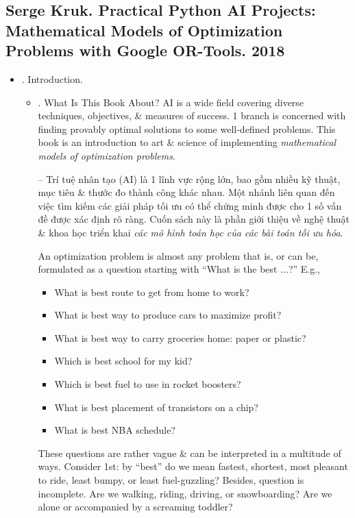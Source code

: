 \documentclass{article}
\begin{document}

\subsection{{\sc Serge Kruk}. Practical Python AI Projects: Mathematical Models of Optimization Problems with Google OR-Tools. 2018}

\begin{itemize}
    \item {. Introduction.}
    \begin{itemize}
        \item {. What Is This Book About?} AI is a wide field covering diverse techniques, objectives, \& measures of success. 1 branch is concerned with finding provably optimal solutions to some well-defined problems. This book is an introduction to art \& science of implementing {\it mathematical models of optimization problems}.

        -- Trí tuệ nhân tạo (AI) là 1 lĩnh vực rộng lớn, bao gồm nhiều kỹ thuật, mục tiêu \& thước đo thành công khác nhau. Một nhánh liên quan đến việc tìm kiếm các giải pháp tối ưu có thể chứng minh được cho 1 số vấn đề được xác định rõ ràng. Cuốn sách này là phần giới thiệu về nghệ thuật \& khoa học triển khai {\it các mô hình toán học của các bài toán tối ưu hóa}.

        An optimization problem is almost any problem that is, or can be, formulated as a question starting with ``What is the best $\ldots$?'' E.g.,
        \begin{itemize}
            \item What is best route to get from home to work?
            \item What is best way to produce cars to maximize profit?
            \item What is best way to carry groceries home: paper or plastic?
            \item Which is best school for my kid?
            \item Which is best fuel to use in rocket boosters?
            \item What is best placement of transistors on a chip?
            \item What is best NBA schedule?
        \end{itemize}
        These questions are rather vague \& can be interpreted in a multitude of ways. Consider 1st: by ``best'' do we mean fastest, shortest, most pleasant to ride, least bumpy, or least fuel-guzzling? Besides, question is incomplete. Are we walking, riding, driving, or snowboarding? Are we alone or accompanied by a screaming toddler?


\end{itemize}
\end{itemize}
\end{document}
